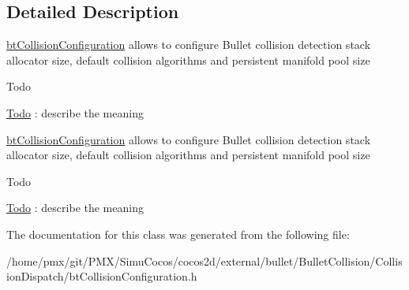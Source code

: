 \subsection{Detailed Description}
\hyperlink{classbtCollisionConfiguration}{bt\+Collision\+Configuration} allows to configure Bullet collision detection stack allocator size, default collision algorithms and persistent manifold pool size \begin{DoxyRefDesc}{Todo}
\item[\hyperlink{todo__todo000009}{Todo}]\+: describe the meaning \end{DoxyRefDesc}


\hyperlink{classbtCollisionConfiguration}{bt\+Collision\+Configuration} allows to configure Bullet collision detection stack allocator size, default collision algorithms and persistent manifold pool size \begin{DoxyRefDesc}{Todo}
\item[\hyperlink{todo__todo000047}{Todo}]\+: describe the meaning \end{DoxyRefDesc}


The documentation for this class was generated from the following file\+:\begin{DoxyCompactItemize}
\item 
/home/pmx/git/\+P\+M\+X/\+Simu\+Cocos/cocos2d/external/bullet/\+Bullet\+Collision/\+Collision\+Dispatch/bt\+Collision\+Configuration.\+h\end{DoxyCompactItemize}
